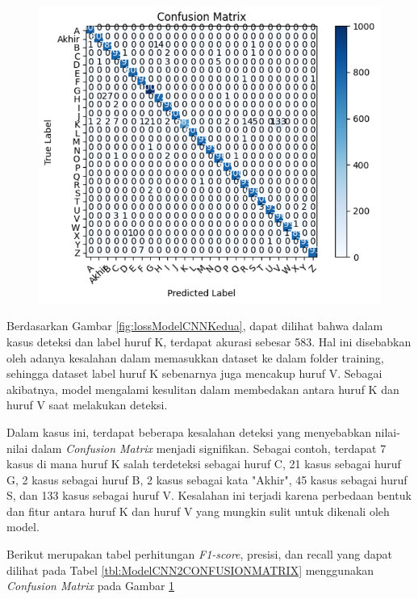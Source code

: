 \begin{figure}[!hbt]
	\centering
	\includegraphics[width=0.7\linewidth]{gambar/bener/ConfusionMatrix_ModelCNN2.png}
	\label{fig:TabelModelCNNKedua}
\end{figure}
Berdasarkan Gambar \ref{fig:lossModelCNNKedua}, dapat dilihat bahwa dalam kasus deteksi dan label huruf K, terdapat akurasi sebesar 583. Hal ini disebabkan oleh adanya kesalahan dalam memasukkan dataset ke dalam folder training, sehingga dataset label huruf K sebenarnya juga mencakup huruf V. Sebagai akibatnya, model mengalami kesulitan dalam membedakan antara huruf K dan huruf V saat melakukan deteksi.

Dalam kasus ini, terdapat beberapa kesalahan deteksi yang menyebabkan nilai-nilai dalam \textit{Confusion Matrix} menjadi signifikan. Sebagai contoh, terdapat 7 kasus di mana huruf K salah terdeteksi sebagai huruf C, 21 kasus sebagai huruf G, 2 kasus sebagai huruf B, 2 kasus sebagai kata "Akhir", 45 kasus sebagai huruf S, dan 133 kasus sebagai huruf V. Kesalahan ini terjadi karena perbedaan bentuk dan fitur antara huruf K dan huruf V yang mungkin sulit untuk dikenali oleh model.

Berikut merupakan tabel perhitungan \textit{F1-score}, presisi, dan recall yang dapat dilihat pada Tabel \ref{tbl:ModelCNN2CONFUSIONMATRIX} menggunakan \textit{Confusion Matrix} pada Gambar \ref{fig:TabelModelCNNKedua}

